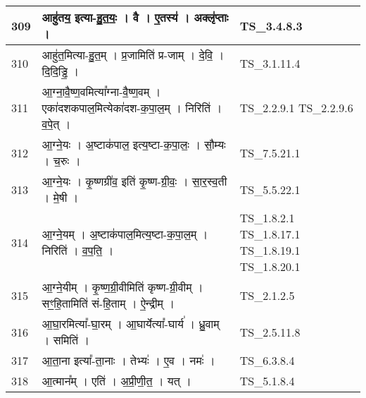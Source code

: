 \documentclass[17pt]{extarticle}
\begin{document}
\begin{longtable}{||p{0.4in}||p{4.9in}||p{0.9in}||}
    \hline
        
    309 & आहु॑तय॒ इत्या{-}हु॒त॒यः॒   ।   वै   ।   ए॒तस्य॑   ।   अक्लृ॑प्ताः   ।    & TS\_3.4.8.3       \\
    
    \hline
        
    310 & आहु॑त॒मित्या{-}हु॒त॒म्   ।   प्र॒जामिति॑ प्र{-}जाम्   ।   दे॒वि॒   ।   दि॒दि॒ड्ढि॒   ।    & TS\_3.1.11.4       \\
    
    \hline
        
    311 & आ॒ग्ना॒वै॒ष्ण॒वमित्या᳚ग्ना{-}वै॒ष्ण॒वम्   ।   एका॑दशकपाल॒मित्येका॑दश{-}क॒पा॒ल॒म्   ।   निरिति॑   ।   व॒पे॒त्   ।    & TS\_2.2.9.1 TS\_2.2.9.6       \\
    
    \hline
        
    312 & आ॒ग्ने॒यः   ।   अ॒ष्टाक॑पाल॒ इत्य॒ष्टा{-}क॒पा॒लः॒   ।   सौ॒म्यः   ।   च॒रुः   ।    & TS\_7.5.21.1       \\
    
    \hline
        
    313 & आ॒ग्ने॒यः   ।   कृ॒ष्णग्री॑व॒ इति॑ कृ॒ष्ण{-}ग्री॒वः॒   ।   सा॒र॒स्व॒ती   ।   मे॒षी   ।    & TS\_5.5.22.1       \\
    
    \hline
        
    314 & आ॒ग्ने॒यम्   ।   अ॒ष्टाक॑पाल॒मित्य॒ष्टा{-}क॒पा॒ल॒म्   ।   निरिति॑   ।   व॒प॒ति॒   ।    & TS\_1.8.2.1 TS\_1.8.17.1 TS\_1.8.19.1 TS\_1.8.20.1       \\
    
    \hline
        
    315 & आ॒ग्ने॒यीम्   ।   कृ॒ष्ण॒ग्री॒वीमिति॑ कृष्ण{-}ग्री॒वीम्   ।   सꣳ॒॒हि॒तामिति॑ सं{-}हि॒ताम्   ।   ऐ॒न्द्रीम्   ।    & TS\_2.1.2.5       \\
    
    \hline
        
    316 & आ॒घा॒रमित्या᳚{-}घा॒रम्   ।   आ॒घार्येत्या᳚{-}घार्य॑   ।   ध्रु॒वाम्   ।   समिति॑   ।    & TS\_2.5.11.8       \\
    
    \hline
        
    317 & आ॒ता॒ना इत्या᳚{-}ता॒नाः   ।   तेभ्यः॑   ।   ए॒व   ।   नमः॑   ।    & TS\_6.3.8.4       \\
    
    \hline
        
    318 & आ॒त्मान᳚म्   ।   एति॑   ।   अ॒प्री॒णी॒त॒   ।   यत्   ।    & TS\_5.1.8.4       \\
    

\end{longtable}
\end{document}
